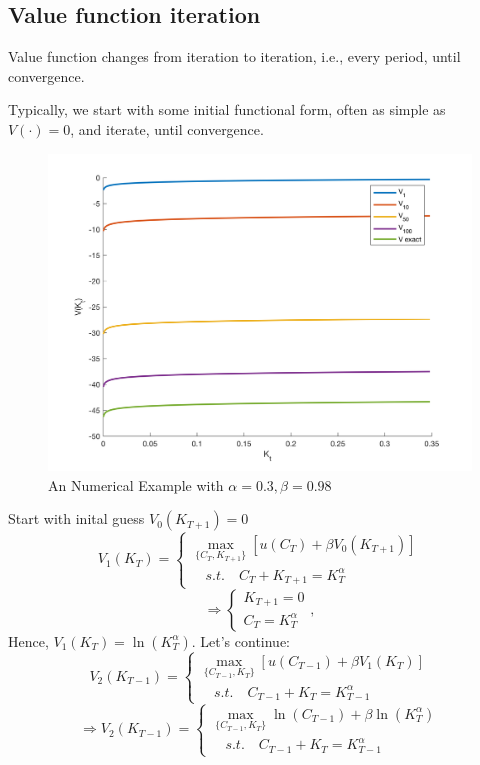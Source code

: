 \documentclass[twoside]{article}
\begin{document}
\subsection{Value function iteration}
Value function changes from iteration to iteration, i.e., every period, until convergence.

Typically, we start with some initial functional form, often as simple as $V(\cdot) = 0$, and iterate, until convergence.

\begin{figure}[htbp] 
    \centering
    \includegraphics[width=.8\textwidth]{figure/vfi.png}
    \caption{An Numerical Example with $\alpha = 0.3, \beta = 0.98$}
\end{figure}

Start with inital guess $V_0(K_{T+1}) = 0$
\begin{equation}
    V_1(K_T) = \begin{cases}
        \max\limits_{\{C_T, K_{T+1}\}} [u(C_T)+ \beta V_0(K_{T+1})]\\
        \quad s.t. \quad C_T + K_{T+1} = K_T^\alpha
    \end{cases}
\end{equation}
\begin{equation}
    \Longrightarrow \begin{cases}
        K_{T+1} = 0\\
        C_T =  K_T^\alpha
    \end{cases}, 
\end{equation}
Hence, $V_1(K_T) = \ln (K_T^\alpha)$. Let's continue:
\begin{equation}
    V_2(K_{T-1}) = \begin{cases}
        \max\limits_{\{C_{T-1}, K_{T}\}} [u(C_{T-1})+ \beta V_1(K_{T})]\\
        \quad s.t. \quad C_{T-1} + K_{T} = K_{T-1}^\alpha
    \end{cases}
\end{equation}
\begin{equation}
    \Longrightarrow V_2(K_{T-1}) = \begin{cases}
        \max\limits_{\{C_{T-1}, K_{T}\}} \ln(C_{T-1})+ \beta \ln (K_T^\alpha)\\
        \quad s.t. \quad C_{T-1} + K_{T} = K_{T-1}^\alpha
    \end{cases}
\end{equation}
\end{document}
